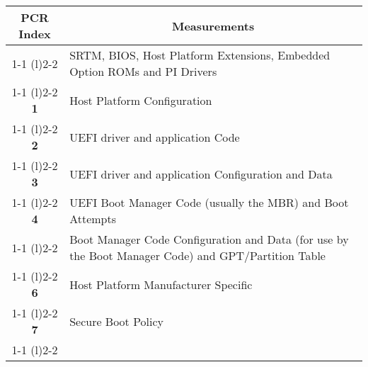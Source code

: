\begin{table}
    \centering
    \begin{tabular}{cp{30em}}
        \toprule
        \multicolumn{1}{c}{{\bfseries \acs{PCR} Index}} & \multicolumn{1}{c}{{\bfseries Measurements}}                                                             \\
        \cmidrule[0.4pt](r){1-1}
        \cmidrule[0.4pt](l){2-2}
        \multirow{2}{*}{\textbf{0}}                     & SRTM, BIOS, Host Platform Extensions, Embedded Option ROMs and PI Drivers                                \\
        \cmidrule[0.4pt](r){1-1}
        \cmidrule[0.4pt](l){2-2}
        \textbf{1}                                      & Host Platform Configuration                                                                              \\
        \cmidrule[0.4pt](r){1-1}
        \cmidrule[0.4pt](l){2-2}
        \textbf{2}                                      & UEFI driver and application Code                                                                         \\
        \cmidrule[0.4pt](r){1-1}
        \cmidrule[0.4pt](l){2-2}
        \textbf{3}                                      & UEFI driver and application Configuration and Data                                                       \\
        \cmidrule[0.4pt](r){1-1}
        \cmidrule[0.4pt](l){2-2}
        \textbf{4}                                      & UEFI Boot Manager Code (usually the MBR) and Boot Attempts                                               \\
        \cmidrule[0.4pt](r){1-1}
        \cmidrule[0.4pt](l){2-2}
        \multirow{2}{*}{\textbf{5}}                     & Boot Manager Code Configuration and Data (for use by the Boot Manager Code) and \ac{GPT}/Partition Table \\
        \cmidrule[0.4pt](r){1-1}
        \cmidrule[0.4pt](l){2-2}
        \textbf{6}                                      & Host Platform Manufacturer Specific                                                                      \\
        \cmidrule[0.4pt](r){1-1}
        \cmidrule[0.4pt](l){2-2}
        \textbf{7}                                      & Secure Boot Policy                                                                                       \\
        \cmidrule[0.4pt](r){1-1}
        \cmidrule[0.4pt](l){2-2}

\end{tabular}
\end{table}
